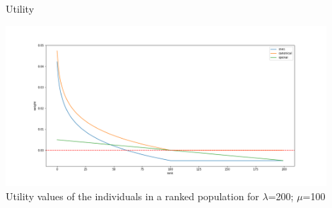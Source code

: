 \begin{frame}{\tcii{} Utility}
    \begin{center}
      \includegraphics[height=6cm]{images/ES/es_weights.png}\\
      \small Utility values of the individuals in a ranked population for $\lambda$=200; $\mu$=100
    \end{center}
\end{frame}

